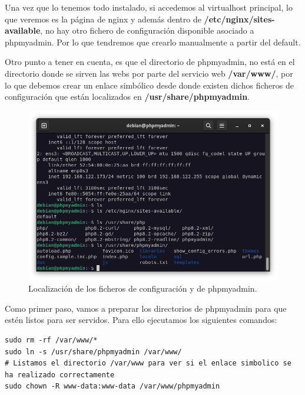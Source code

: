 Una vez que lo tenemos todo instalado, si accedemos al virtualhost principal, lo que veremos es la página de nginx y además dentro de \textbf{/etc/nginx/sites-available}, no hay otro fichero de configuración disponible asociado a phpmyadmin. Por lo que tendremos que crearlo manualmente a partir del default. 
\vspace{5mm}

Otro punto a tener en cuenta, es que el directorio de phpmyadmin, no está en el directorio donde se sirven las webs por parte del servicio web \textbf{/var/www/}, por lo que debemos crear un enlace simbólico desde donde existen dichos ficheros de configuración que están localizados en \textbf{/usr/share/phpmyadmin}.

\begin{figure}[H]
	\centering
	\includegraphics[scale=0.30]{05}
	\caption{Localización de los ficheros de configuración y de phpmyadmin.}
\end{figure}

Como primer paso, vamos a preparar los directorios de phpmyadmin para que estén listos para ser servidos. Para ello ejecutamos los siguientes comandos:

\begin{lstlisting}[style=mybash]
sudo rm -rf /var/www/*
sudo ln -s /usr/share/phpmyadmin /var/www/
# Listamos el directorio /var/www para ver si el enlace simbolico se ha realizado correctamente
sudo chown -R www-data:www-data /var/www/phpmyadmin
\end{lstlisting}

